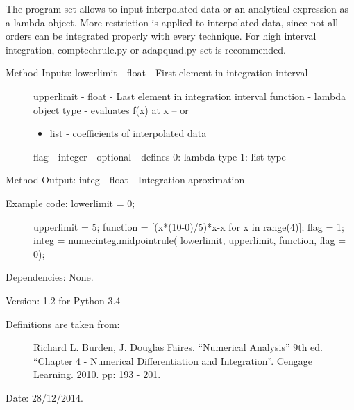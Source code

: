 \documentclass[letterpaper,10pt,oneside]{sphinxmanual}
\theoremstyle{plain}%
\theoremstyle{definition}%
\theoremstyle{remark}%
\begin{document}
The program set allows to input interpolated data or an analytical expression
as a lambda object. More restriction is applied to interpolated data, since
not all orders can be integrated properly with every technique. For high 
interval integration, comptechrule.py or adapquad.py set is recommended.
\begin{description}
\item[{Method Inputs: lowerlimit - float - First element in integration interval}] \leavevmode
upperlimit - float - Last element in integration interval
function - lambda object type - evaluates f(x) at x -- or
\begin{itemize}
\item {} 
list - coefficients of interpolated data

\end{itemize}

flag - integer - optional - defines 0: lambda type 1: list type

\end{description}

Method Output: integ - float - Integration aproximation
\begin{description}
\item[{Example code: lowerlimit = 0;}] \leavevmode
upperlimit = 5;
function = {[}(x*(10-0)/5)*x-x for x in range(4){]};
flag = 1;
integ =                   numecinteg.midpointrule(
lowerlimit, upperlimit, function, flag = 0);

\end{description}

Dependencies: None.

Version: 1.2 for Python 3.4
\begin{description}
\item[{Definitions are taken from:}] \leavevmode
Richard L. Burden, J. Douglas Faires. ``Numerical Analysis'' 9th ed.
``Chapter 4 - Numerical Differentiation and Integration''. 
Cengage Learning. 2010. pp: 193 - 201.

\end{description}




Date: 28/12/2014.
\end{document}
